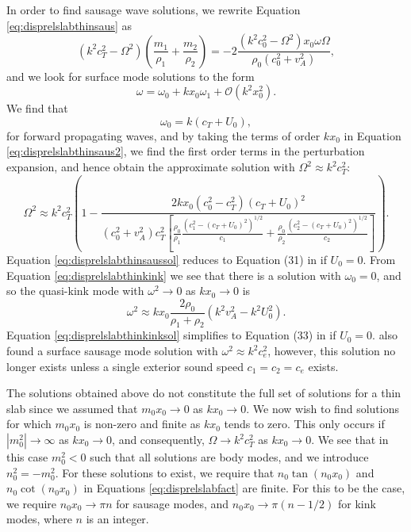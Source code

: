 \documentclass[12pt]{ociamthesis}
\begin{document}
In order to find sausage wave solutions, we rewrite Equation \eqref{eq:disprelslabthinsaus} as
%
\begin{equation}
\label{eq:disprelslabthinsaus2}
( k^2 c_T^2 - \Omega^2) \left( \frac{m_1}{\rho_1} + \frac{m_2}{\rho_2} \right)
= - 2 \frac{(k^2 c_0^2 - \Omega^2) x_0 \omega \Omega}{\rho_0 (c_0^2 + v_A^2)},
\end{equation}
%
and we look for surface mode solutions to the form
%
\begin{equation}
\label{eq:omegapert}
\omega = \omega_{0} + k x_0 \omega_{1} + \mathcal{O}(k^2 x_0^2).
\end{equation}
%
We find that
%
\begin{equation}
\label{eq:omega00}
\omega_{0} = k(c_T + U_0),
\end{equation}
%
for forward propagating waves, and by taking the terms of order $k x_0$ in Equation \eqref{eq:disprelslabthinsaus2}, we find the first order terms in the perturbation expansion, and hence obtain the approximate solution with $\Omega^2 \approx k^2 c_T^2$:
%
\begin{equation}
\label{eq:disprelslabthinsaussol}
\Omega^2
\approx k^2 c_T^2 \left(1
- \frac{2 k x_0 (c_0^2 - c_T^2) (c_T + U_0)^2}
{(c_0^2 + v_A^2) c_T^2
\left[ \frac{\rho_0}{\rho_1} \frac{(c_1^2 - (c_T + U_0)^2)^{1/2}}{c_1}
+ \frac{\rho_0}{\rho_2} \frac{(c_2^2 - (c_T + U_0)^2)^{1/2}}{c_2}
\right]} \right).
\end{equation}
%
Equation \eqref{eq:disprelslabthinsaussol} reduces to Equation (31) in \cite{Allcock2017} if $U_0 = 0$.
From Equation \eqref{eq:disprelslabthinkink} we see that there is a solution with $\omega_{0} = 0$, and so the quasi-kink mode with $\omega^2 \to 0$ as $k x_0 \to 0$ is
\begin{equation}
\label{eq:disprelslabthinkinksol}
\omega^2 \approx k x_0 \frac{2 \rho_0}{\rho_1 + \rho_2} (k^2 v_A^2 - k^2 U_0^2). 
\end{equation}
Equation \eqref{eq:disprelslabthinkinksol} simplifies to Equation (33) in \cite{Allcock2017} if $U_0 = 0$.
\cite{Roberts1981b} also found a surface sausage mode solution with $\omega^2 \approx k^2 c_e^2$, however, this solution no longer exists unless a single exterior sound speed $c_1 = c_2 = c_e$ exists.

The solutions obtained above do not constitute the full set of solutions for a thin slab since we assumed that $m_0 x_0 \to 0$ as $k x_0 \to 0$.
We now wish to find solutions for which $m_0 x_0$ is non-zero and finite as $k x_0$ tends to zero.
This only occurs if $|m_0^2| \to \infty$ as $k x_0 \to 0$, and consequently, $\Omega \to k^2 c_T^2$ as $k x_0 \to 0$.
We see that in this case $m_0^2 < 0$ such that all solutions are body modes, and we introduce $n_0^2 = - m_0^2$.
For these solutions to exist, we require that $n_0 \tan(n_0 x_0)$ and $n_0 \cot(n_0 x_0)$ in Equations \eqref{eq:disprelslabfact} are finite.
For this to be the case, we require $n_0 x_0 \to \pi n$ for sausage modes, and $n_0 x_0 \to \pi ( n - 1/2)$ for kink modes, where $n$ is an integer.
\end{document}
